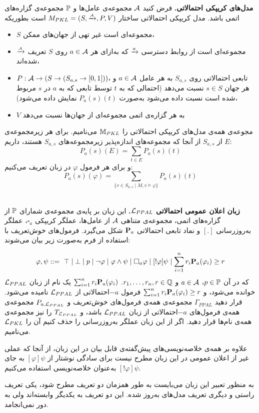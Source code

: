 \begin{definition}{\textbf{مدل‌های کریپکی احتمالاتی.}}
فرض کنید $ \mathcal{A} $ مجموعه‌ی عامل‌ها و $ \mathbb{P} $ مجموعه‌ی گزاره‌های اتمی باشد. مدل کریپکی احتمالاتی ساختار $ M_{PKL}=(S,\xrightarrow{\scriptscriptstyle{\mathcal{A}}},P,V) $ است بطوریکه
\begin{itemize}
\item
$ S $ مجموعه‌ای است غیر تهی از جهان‌های ممکن،
\item
 $ \xrightarrow{\scriptscriptstyle{\mathcal{A}}} $ مجموعه‌ای است از روابط دسترسی $ \xrightarrow{a} $ که به‌ازای هر $ a\in\mathcal{A} $ روی $ S $ تعریف شده‌اند،
\item
$ P:\mathcal{A}\rightarrow (S\rightarrow(S_{a,s}\rightarrow[0,1])) $، تابعی احتمالاتی روی $ S_{a,s} $ به هر عامل $ a\in\mathcal{A} $ و هر جهان $ s\in S $ نسبت می‌دهد (احتمالی که به $ t $ توسط تابعی که به $ a $ در $ s $ مربوط شده است نسبت داده می‌شود به‌صورت $ P_a(s)(t) $ نمایش داده می‌شود)،
\item
$ V $ به هر گزاره‌ی اتمی مجموعه‌ای از جهان‌ها نسبت می‌دهد
\end{itemize}
مجوعه‌ی همه‌ی مدل‌های کریپکی احتمالاتی را $ \mathbb{M}_{PKL} $ می‌نامیم. برای هر زیرمجموعه‌ی $ E $ از $ S_{a,s} $ از آنجا که مجموعه‌های اندازه‌پذیر زیرمجموعه‌های $ S_{a,s} $ هستند، داریم: 
$$P_a(s)(E)=\sum_{t\in E}P_a(s)(t)$$
و برای هر فرمول $ \varphi $ در زبان تعریف می‌کنیم:
$$P_a(s)(\varphi)=\sum_{\{v\in S_{a,s}\mid M,v\vDash \varphi\}}P_a(s)(t)$$\\
\end{definition}
\begin{definition}\textbf{زبان اعلان عمومی احتمالاتی $ \mathcal{L}_{PPAL} $.}
این زبان بر پایه‌ی مجموعه‌ی شمارای $ \mathbb{P} $ از گزاره‌های اتمی، مجموعه‌ی متناهی $ \mathcal{A} $ از عامل‌ها، عملگر کریپکی $ \square_a $، عملگر به‌روزرسانی $ [.] $ و نماد تابعی احتمالاتی $ \mathbf{P}_a $ شکل می‌گیرد. فرمول‌های خوش‌تعریف با استفاده از فرم  به‌صورت زیر بیان می‌شوند:

\begin{equation*}
\varphi,\psi ::=\ \top\mid\bot\mid p\mid \neg\varphi\mid\varphi\land\psi\mid \square_a\varphi\mid [!\varphi]\psi\mid\sum_{i=1}^n r_i \mathbf{P}_a(\varphi_i)\geq r
\end{equation*}
که در آن $ p\in \mathbb{P} $، $ a\in\mathcal{A} $ و $ r_1,\ldots,r_n,r\in\mathbb{Q} $. $\sum_{i=1}^n r_i \mathbf{P}_a(\varphi_i)$  یک نام از زبان $\mathcal{L}_{PPAL}$ خوانده می‌شود، و $ \sum_{i=1}^n r_i \mathbf{P}_a(\varphi_i)\geq r $ فرمول $ -a $احتمالاتی از $\mathcal{L}_{PPAL}$ نامیده می‌شود. قرار دهید $ \Gamma_{PPAL} $ مجموعه‌ی همه‌ی فرمول‌های خوش‌تعریف و $ P_{a,\mathcal{L}_{PPAL}} $ مجموعه‌ی همه‌ی فرمول‌های $ -a $احتمالاتی از زبان $\mathcal{L}_{PPAL}$ باشد، و $ T_{\mathcal{L}_{PPAL}} $ را نیز مجموعه‌ی همه‌ی نام‌ها قرار دهید. اگر از این زبان عملگر به‌روزرسانی را حذف کنیم آن را $ \mathcal{L}_{PKL} $ می‌نامیم.

علاوه بر همه‌ی خلاصه‌نویسی‌های پیش‌گفته‌ی قابل بیان در این زبان، از آنجا که عملی غیر از اعلان عمومی در این زبان مطرح نیست برای سادگی نوشتار از $ [\varphi]\psi $ به جای $ [!\varphi]\psi $ به‌عنوان خلاصه‌نویسی استفاده می‌کنیم.
\end{definition}
به منظور تعبیر این زبان می‌بایست به طور همزمان دو تعریف مطرح شود، یکی تعریف راستی و دیگری تعریف مدل‌های به‌روز شده. این دو تعریف به یکدیگر وابسته‌اند ولی به دور نمی‌انجامد.

